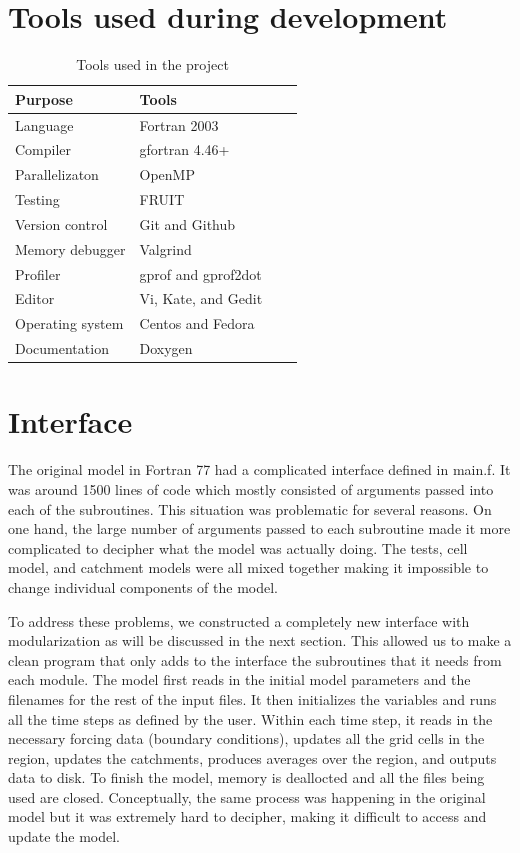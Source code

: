 \documentclass[pdftex,12pt,a4paper]{article}
\begin{document}
\newpage
\section{Tools used during development}
\begin{table}[ht]
  \begin{center}
    \caption{Tools used in the project}
    \begin{tabular}{ | l | l | l | p{5cm} |}
    \hline
    Purpose & Tools \\ \hline
    Language & Fortran 2003 \\
    Compiler & gfortran 4.46+ \\
    Parallelizaton & OpenMP \\
    Testing & FRUIT \\ 
    Version control & Git and Github \\ 
    Memory debugger & Valgrind \\ 
    Profiler & gprof and gprof2dot\\ 
    Editor & Vi, Kate, and Gedit \\
    Operating system & Centos and Fedora \\
    Documentation & Doxygen \\ \hline
    \end{tabular}
  \end{center}
\end{table}

\section{Interface}
The original model in Fortran 77 had a complicated interface defined in main.f. It was around 1500 lines of code which mostly consisted of arguments passed into each of the subroutines. This situation was problematic for several reasons. On one hand, the large number of arguments passed to each subroutine made it more complicated to decipher what the model was actually doing. The tests, cell model, and catchment models were all mixed together making it impossible to change individual components of the model. 

\vspace{1em}

To address these problems, we constructed a completely new interface with modularization as will be discussed in the next section. This allowed us to make a clean program that only adds to the interface the subroutines that it needs from each module. The model first reads in the initial model parameters and the filenames for the rest of the input files. It then initializes the variables and runs all the time steps as defined by the user. Within each time step, it reads in the necessary forcing data (boundary conditions), updates all the grid cells in the region, updates the catchments, produces averages over the region, and outputs data to disk. To finish the model, memory is deallocted and all the files being used are closed. Conceptually, the same process was happening in the original model but it was extremely hard to decipher, making it difficult to access and update the model. 
\end{document}

